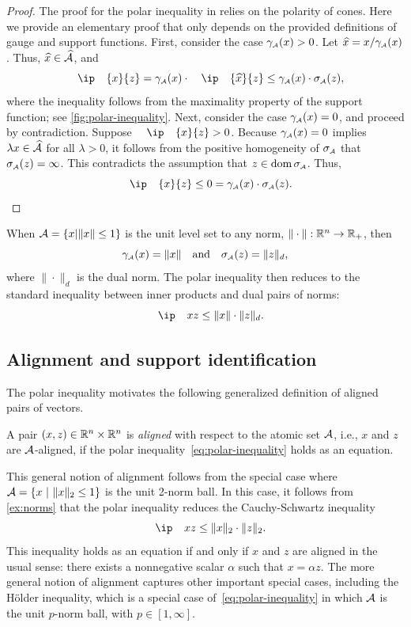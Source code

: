\begin{proof}
    The proof for the polar inequality in
    \cite[Section~15]{rockafellar1970convex} relies on the polarity of cones.
    Here we provide an elementary proof that only depends on the provided
    definitions of gauge and support functions. First, consider the case
    $\gamma_{\scriptscriptstyle\mathcal{A}}(x) > 0$. Let $\xhat=x/\gauge\As(x)$. Thus, $\xhat\in\convA$, and
    \[
      \ip{x}{z} = \gauge\As(x)\cdot\ip{\xhat}{z} \leq \gauge\As(x)\cdot\sigma\As(z),
    \]
    where the inequality follows from the maximality property of the support
  function; see \autoref{fig:polar-inequality}. Next, consider the case $\gamma_{\scriptscriptstyle\mathcal{A}}(x)
  = 0$, and proceed by contradiction. Suppose $\ip{x}{z} > 0$. Because
  $\gamma_{\scriptscriptstyle\mathcal{A}}(x) = 0$ implies $\lambda x \in \widehat{\mathcal{A}}$ for all $\lambda > 0$, it
  follows from the positive homogeneity of $\sigma_{\scriptscriptstyle\mathcal{A}}$ that $\sigma_{\scriptscriptstyle\mathcal{A}}(z) =
  \infty$. This contradicts the assumption that $z \in \operatorname{dom}\sigma_{\scriptscriptstyle\mathcal{A}}$. Thus, 
  \[
     \ip{x}{z} \leq 0 = \gauge\As(x)\cdot\sigma\As(z).
  \]
\end{proof}

\begin{example}[Norms] \label{ex:norms}
    When $\mathcal{A}=\{x|\|x\|\le1\}$ is the unit level set to any norm,
  $\|\cdot\|:\mathbb{R}^n\to\mathbb{R}_+$, then
  \[
    \gamma_{\scriptscriptstyle\mathcal{A}}(x) = \|x\|
    \hbox{\quad and\quad}
    \sigma_{\scriptscriptstyle\mathcal{A}}(z) = \|z\|_d,
  \]
  where $\|\cdot\|_d$ is the dual norm. The polar inequality then reduces to the
  standard inequality between inner products and dual pairs of norms:
  \[
    \ip x z \le \|x\|\cdot \|z\|_d. 
  \]
\end{example}

\subsection{Alignment and support identification}

The polar inequality motivates the following generalized definition of aligned
pairs of vectors.
\begin{definition}[Alignment] \label{def:alignment} A pair
  $(x,z)\in\mathbb{R}^n\times\mathbb{R}^n$ is \emph{aligned} with respect to the atomic
  set $\mathcal{A}$, i.e., $x$ and $z$ are $\mathcal{A}$-aligned, if the polar
  inequality~\eqref{eq:polar-inequality} holds as an equation.
\end{definition}

This general notion of alignment follows from the special case where
$\mathcal{A}=\{x~|~\|x\|_2 \leq 1\}$ is the unit 2-norm ball. In this case, it follows
from \autoref{ex:norms} that the polar inequality reduces the Cauchy-Schwartz inequality
\begin{equation*}
  \label{eq:cauchy-inequality}
  \ip x z \le \norm{x}_2\cdot\norm{z}_2.
\end{equation*}
This inequality holds as an equation if and only if $x$ and $z$ are aligned in
the usual sense: there exists a nonnegative scalar $\alpha$ such that
$x=\alpha z$. The more general notion of alignment captures other important special
cases, including the H\"older inequality, which is a
special case of~\eqref{eq:polar-inequality} in which $\mathcal{A}$ is the unit
$p$-norm ball, with $p\in[1,\infty]$.

